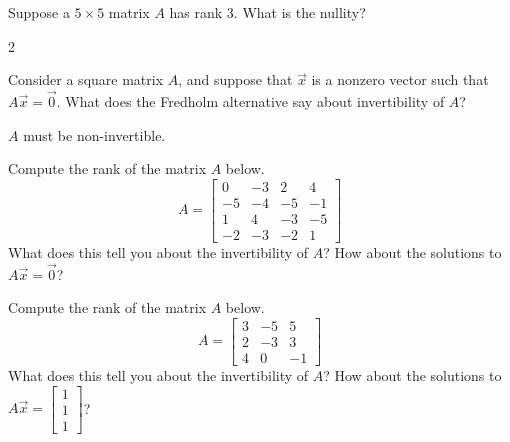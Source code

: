 \begin{exercise}
Suppose a $5 \times 5$ matrix $A$ has rank 3.  What is the nullity?
\end{exercise}
\comboSol{%
}
{%
2
}

\begin{exercise}
Consider a square matrix $A$, and suppose that $\vec{x}$ is a nonzero
vector such that $A \vec{x} = \vec{0}$.  What does the Fredholm alternative
say about invertibility of $A$?
\end{exercise}
\comboSol{%
}
{%
$A$ must be non-invertible.
}

\begin{exercise}\ansMark%
Compute the rank of the matrix $A$ below.
\[ A =  \begin{bmatrix} 0 & -3 & 2 & 4 \\ -5 & -4 &-5 & -1 \\ 1&4&-3 & -5\\ -2 & -3 &-2&1\end{bmatrix} \]
What does this tell you about the invertibility of $A$? How about the solutions to $A\vec{x} = \vec{0}$? 
\end{exercise}

\begin{exercise}\ansMark%
Compute the rank of the matrix $A$ below.
\[ A =  \begin{bmatrix} 3 & -5 & 5 \\ 2 &-3 & 3\\ 4 & 0 & -1 \end{bmatrix} \]
What does this tell you about the invertibility of $A$? How about the solutions to $A\vec{x} = \begin{bmatrix} 1\\1\\1 \end{bmatrix}$? 
\end{exercise}


